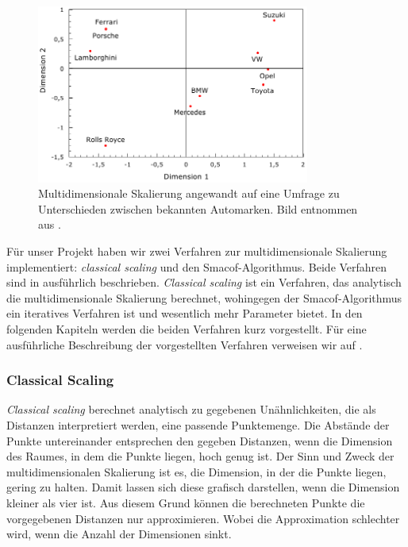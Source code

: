 \begin{figure}
 \centering
 \includegraphics[width=0.8\textwidth]{./Bilder/Clustering/mittlereunaenlichkeitenderautomarken.png}
\caption{Multidimensionale Skalierung angewandt auf eine Umfrage zu Unterschieden 
zwi\-schen bekannten Automarken. Bild entnommen aus \cite{Kappelhoff2001}.}\label{img:MDSAutoMarkenBeispiel}
\end{figure} 

Für unser Projekt haben wir zwei Verfahren zur multidimensionale Skalierung implementiert: \textit{classical scaling} und den Smacof-Algorithmus.
Beide Verfahren sind in \cite{BorgGroenen2005} ausführlich beschrieben. \textit{Classical scaling} ist ein Verfahren, das 
analytisch die multidimensionale Skalierung berechnet, wohingegen der Smacof-Algorithmus ein iteratives Verfahren ist
und wesentlich mehr Parameter bietet. In den folgenden Kapiteln werden die beiden Verfahren kurz vorgestellt. 
Für eine ausführliche Beschreibung der vorgestellten Verfahren verweisen wir auf \cite{BorgGroenen2005}.

\subsubsection{Classical Scaling}
\textit{Classical scaling} berechnet analytisch zu gegebenen Unähnlichkeiten, die als Distanzen interpretiert werden, eine passende Punktemenge.
Die Abstände der Punkte untereinander entsprechen den gegeben Distanzen, wenn die Dimension des Raumes, in dem die Punkte liegen,
hoch genug ist. 
Der Sinn und Zweck der multidimensionalen Skalierung ist es, die Dimension, in der die Punkte liegen, 
gering zu halten. Damit lassen sich diese grafisch darstellen, wenn die Dimension kleiner als vier ist.
Aus diesem Grund können die berechneten Punkte 
die vorgegebenen Distanzen nur approximieren. Wobei die Approximation schlechter wird, wenn die Anzahl der Dimensionen sinkt.

